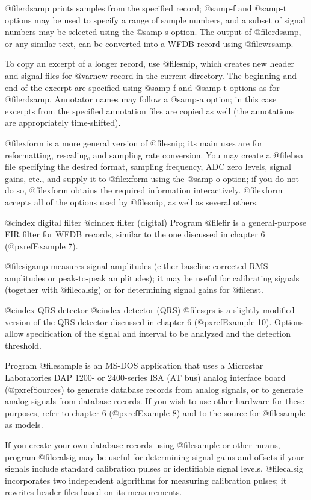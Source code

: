 {{{{{{{{@file{rdsamp} prints samples from the specified record;  @samp{-f} and
@samp{-t} options may be used to specify a range of sample numbers, and
a subset of signal numbers may be selected using the @samp{-s}
option.  The output of @file{rdsamp}, or any similar text, can be
converted into a WFDB record using @file{wrsamp}.

To copy an excerpt of a longer record, use @file{snip}, which creates
new
header and signal files for @var{new-record} in the current directory.
The beginning and end of the excerpt are specified using @samp{-f} and
@samp{-t} options as for @file{rdsamp}.  Annotator names may follow a @samp{-a}
option; in this case excerpts from the specified annotation files are copied as
well (the annotations are appropriately time-shifted).

@file{xform} is a more general version of @file{snip}; its main uses are for
reformatting, rescaling, and sampling rate conversion.  You may create a
@file{hea} file specifying the desired format, sampling frequency, ADC zero
levels, signal gains, etc., and supply it to @file{xform} using the @samp{-o}
option; if you do not do so, @file{xform} obtains the required information
interactively.  @file{xform} accepts all of the options used by @file{snip},
as well as several others.

@cindex digital filter
@cindex filter (digital)
Program @file{fir} is a general-purpose FIR filter for WFDB records,
similar to the one discussed in chapter 6 (@pxref{Example 7}).

@file{sigamp} measures signal amplitudes (either baseline-corrected RMS
amplitudes or peak-to-peak amplitudes);  it may be useful for calibrating
signals (together with @file{calsig}) or for determining signal gains
for @file{nst}.

@cindex QRS detector
@cindex detector (QRS)
@file{sqrs} is a slightly modified version of the QRS detector
discussed in chapter 6 (@pxref{Example 10}).  Options allow
specification of the signal and interval to be analyzed and the
detection threshold.

Program @file{sample} is an MS-DOS application that uses a Microstar
Laboratories DAP 1200- or 2400-series ISA (AT bus) analog interface
board (@pxref{Sources}) to generate database records from analog
signals, or to generate analog signals from database records.  If you
wish to use other hardware for these purposes, refer to chapter 6
(@pxref{Example 8}) and to the source for @file{sample} as
models.

If you create your own database records using @file{sample} or other
means, program @file{calsig} may be useful for determining signal
gains and offsets if your signals include standard calibration pulses or
identifiable signal levels. @file{calsig} incorporates two
independent algorithms for measuring calibration pulses; it rewrites
header files based on its measurements.

}}}}}}}}
